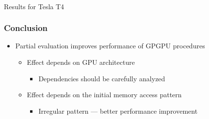 \documentclass[xcolor=table]{beamer}
\begin{document}
\begin{frame}[fragile]
\begin{center}
\begin{minipage}[t]{0.48\textwidth}
\begin{center}
\\Results for Tesla T4
\end{center}
\end{minipage}
\end{center}
\end{frame}

\begin{frame} \frametitle{Conclusion}
  \begin{itemize}
   \item Partial evaluation improves performance of GPGPU procedures
   \begin{itemize}
    \item Effect depends on GPU architecture
    \begin{itemize}
      \item Dependencies should be carefully analyzed
    \end{itemize}
    \item Effect depends on the initial memory access pattern
    \begin{itemize}
      \item Irregular pattern --- better performance improvement
    \end{itemize}
   \end{itemize}
  \end{itemize}
\end{frame}
\end{document}
